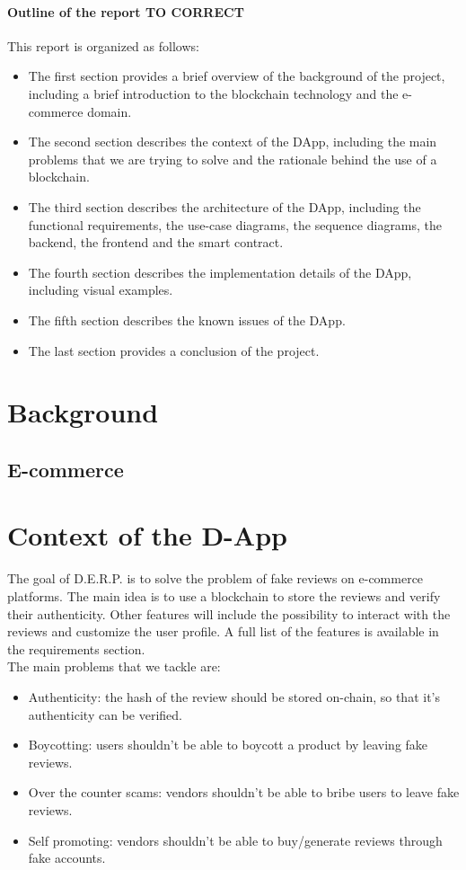 \documentclass[12pt,a4paper,oneside]{article}
\theoremstyle{definition}
\begin{document}
\paragraph{Outline of the report TO CORRECT} This report is organized as follows:
\begin{itemize}
	\item The first section provides a brief overview of the background of the project, including a brief introduction to the blockchain technology and the e-commerce domain.
	\item The second section describes the context of the DApp, including the main problems that we are trying to solve and the rationale behind the use of a blockchain.
	\item The third section describes the architecture of the DApp, including the functional requirements, the use-case diagrams, the sequence diagrams, the backend, the frontend and the smart contract.
	\item The fourth section describes the implementation details of the DApp, including visual examples.
	\item The fifth section describes the known issues of the DApp.
	\item The last section provides a conclusion of the project.
\end{itemize}

\section{Background}

\subsection{E-commerce}

\section{Context of the D-App}
The goal of D.E.R.P. is to solve the problem of fake reviews on e-commerce platforms. The main idea is to use a blockchain to store the reviews and verify their authenticity. Other features will include the possibility to interact with the reviews and customize the user profile. A full list of the features is available in the requirements section. \\
The main problems that we tackle are:
\begin{itemize}  
	\item Authenticity: the hash of the review should be stored on-chain, so that it's authenticity can be verified.
	\item Boycotting: users shouldn't be able to boycott a product by leaving fake reviews.
	\item Over the counter scams: vendors shouldn't be able to bribe users to leave fake reviews.
	\item Self promoting: vendors shouldn't be able to buy/generate reviews through fake accounts.
\end{itemize}
\end{document}
